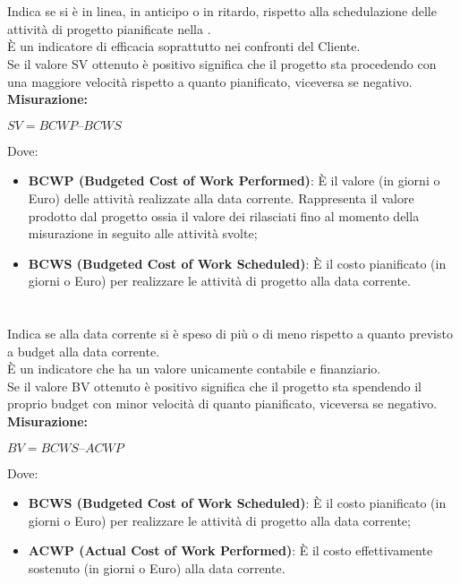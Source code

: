 \documentclass[PianoDiQualifica.tex]{subfiles}
\begin{document}
\paragraph{}
\\
Indica se si è in linea, in anticipo o in ritardo, rispetto alla schedulazione delle attività di progetto pianificate nella .\\
È un indicatore di efficacia soprattutto nei confronti del Cliente. \\
Se il valore SV ottenuto è positivo significa che il progetto sta procedendo con una maggiore velocità rispetto a quanto pianificato, viceversa se negativo.\\
\textbf{Misurazione:}
\begin{center}
	 $ SV = BCWP – BCWS $
\end{center}
Dove: \begin{itemize}
	\item \textbf{BCWP (Budgeted Cost of Work Performed)}: \`{E} il valore (in giorni o Euro) delle attività realizzate alla data corrente.
	Rappresenta il valore prodotto dal progetto ossia il valore dei  rilasciati fino al momento della misurazione in seguito alle attività svolte;
	\item \textbf{BCWS (Budgeted Cost of Work Scheduled)}: \`{E} il costo pianificato (in giorni o Euro) per realizzare le attività di progetto alla data corrente.
\end{itemize}


\paragraph{}
\\
Indica se alla data corrente si è speso di più o di meno rispetto a quanto previsto a budget alla data corrente.\\
È un indicatore che ha un valore unicamente contabile e finanziario.\\
Se il valore BV ottenuto è positivo significa che il progetto sta spendendo il proprio budget con minor velocità di quanto pianificato, viceversa se negativo.\\

\textbf{Misurazione:}
\begin{center}
	$ BV = BCWS – ACWP $
\end{center}
Dove: \begin{itemize}
	\item \textbf{BCWS (Budgeted Cost of Work Scheduled)}: \`{E} il costo pianificato (in giorni o Euro) per realizzare le attività di progetto alla data corrente;
	\item \textbf{ACWP (Actual Cost of Work Performed)}: \`{E} il costo effettivamente sostenuto (in giorni o Euro) alla data corrente.
\end{itemize}
\end{document}

